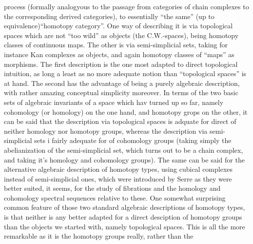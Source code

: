 process (formally analogyous to the passage from  categories of
chain complexes to the corresponding derived categories), to essentially
``the same'' (up to equivalence)\hand{|}\allowbreak{}``homotopy category''. One way of describing
it is via topological spaces which are not ``too wild'' as objects (the
C.W.-spaces),  being homotopy classes of continuous maps. The
other is via semi-simplicial sets, taking for instance Kan complexes as
objects, and again homotopy classes of ``maps'' as morphisms. The first
description is the one most adapted to direct topological intuition,
as long a least as no more adequate notion than ``topological spaces'' is
at hand. The second has the advantage of being a purely algebraic
description, with rather amazing conceptual simplicity moreover. In
terms of the two basic sets of algebraic invariants of a space which hav
turned up so far, namely cohomology (or homology) on the one hand, and
homotopy grops on the other, it can be said that the description via
topological spaces is adquate for direct  of neither homology
nor homotopy groups, whereas the description via semi-simplicial sets i
fairly adequate for  of cohomology groups (taking simply the
abelianization of the semi-simplicial set, which turns out to be a
chain complex, and taking it's homology and cohomology groups). The
same can be said for the alternative algebraic description of homotopy
types, using cubical complexes instead of semi-simplicial ones, which
were introduced by Serre\hand{,} as they were better suited, it seems, for the
study of fibrations and  the homology and cohomology spectral sequences
relative to these. One somewhat surprising common feature of those two
standard algebraic descriptions of homotopy types, is that neither is
any better adapted for a direct desciption of homotopy groups than the
objects we started with, namely topological spaces. This is all the
more remarkable as it is the homotopy groups really, rather than the
